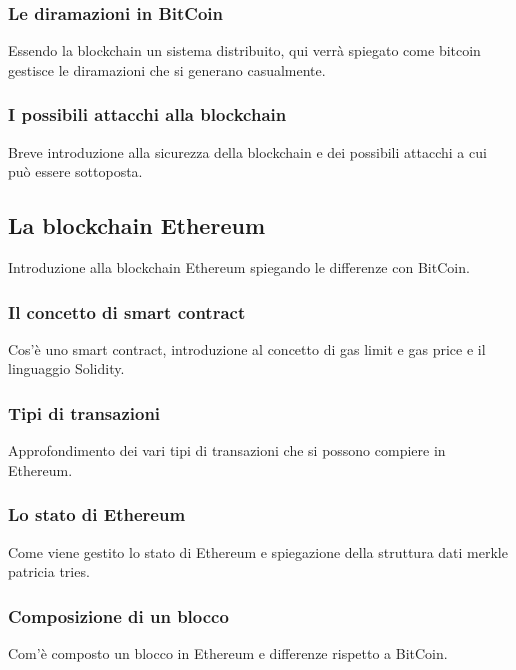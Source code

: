 \subsubsection{Le diramazioni in BitCoin}
Essendo la blockchain un sistema distribuito, qui verrà spiegato come bitcoin gestisce le diramazioni che si generano casualmente.

\subsubsection{I possibili attacchi alla blockchain}
Breve introduzione alla sicurezza della blockchain e dei possibili attacchi a cui può essere sottoposta.

\subsection{La blockchain Ethereum}
Introduzione alla blockchain Ethereum spiegando le differenze con BitCoin.

\subsubsection{Il concetto di smart contract}
Cos'è uno smart contract, introduzione al concetto di gas limit e gas price e il linguaggio Solidity.

\subsubsection{Tipi di transazioni}
Approfondimento dei vari tipi di transazioni che si possono compiere in Ethereum.

\subsubsection{Lo stato di Ethereum}
Come viene gestito lo stato di Ethereum e spiegazione della struttura dati merkle patricia tries.

\subsubsection{Composizione di un blocco}
Com'è composto un blocco in Ethereum e differenze rispetto a BitCoin.


